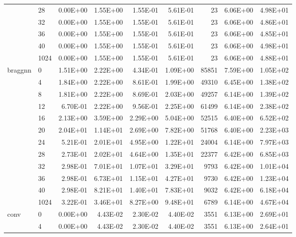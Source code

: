 \begin{longtable}{llrrrrrrr}
         & 28   &   0.00E+00 & 1.55E+00 & 1.55E-01 & 5.61E-01 &      23 &     6.06E+00 & 4.98E+01 \\
         & 32   &   0.00E+00 & 1.55E+00 & 1.55E-01 & 5.61E-01 &      23 &     6.06E+00 & 4.86E+01 \\
         & 36   &   0.00E+00 & 1.55E+00 & 1.55E-01 & 5.61E-01 &      23 &     6.06E+00 & 4.85E+01 \\
         & 40   &   0.00E+00 & 1.55E+00 & 1.55E-01 & 5.61E-01 &      23 &     6.06E+00 & 4.98E+01 \\
         & 1024 &   0.00E+00 & 1.55E+00 & 1.55E-01 & 5.61E-01 &      23 &     6.06E+00 & 4.88E+01 \\
braggnn & 0    &   1.51E+00 & 2.22E+00 & 4.34E-01 & 1.09E+00 &   85851 &     7.59E+00 & 1.05E+02 \\
         & 4    &   1.84E+00 & 2.22E+00 & 8.61E-01 & 1.99E+00 &   49310 &     6.45E+00 & 1.38E+02 \\
         & 8    &   1.81E+00 & 2.22E+00 & 8.69E-01 & 2.03E+00 &   49257 &     6.14E+00 & 1.39E+02 \\
         & 12   &   6.70E-01 & 2.22E+00 & 9.56E-01 & 2.25E+00 &   61499 &     6.14E+00 & 2.38E+02 \\
         & 16   &   2.13E+00 & 3.59E+00 & 2.29E+00 & 5.04E+00 &   52515 &     6.40E+00 & 6.52E+02 \\
         & 20   &   2.04E+01 & 1.14E+01 & 2.69E+00 & 7.82E+00 &   51768 &     6.40E+00 & 2.23E+03 \\
         & 24   &   5.21E-01 & 2.01E+01 & 4.95E+00 & 1.22E+01 &   24004 &     6.14E+00 & 7.97E+03 \\
         & 28   &   2.73E-01 & 2.02E+01 & 4.64E+00 & 1.35E+01 &   22377 &     6.42E+00 & 6.85E+03 \\
         & 32   &   2.98E-01 & 7.01E+01 & 1.07E+01 & 3.29E+01 &    9793 &     6.42E+00 & 1.01E+04 \\
         & 36   &   2.98E-01 & 6.73E+01 & 1.15E+01 & 4.27E+01 &    9730 &     6.42E+00 & 1.23E+04 \\
         & 40   &   2.98E-01 & 8.21E+01 & 1.40E+01 & 7.83E+01 &    9032 &     6.42E+00 & 6.18E+04 \\
         & 1024 &   3.22E-01 & 3.46E+01 & 8.27E+00 & 9.48E+01 &    6789 &     6.14E+00 & 4.67E+04 \\
conv & 0    &   0.00E+00 & 4.43E-02 & 2.30E-02 & 4.40E-02 &    3551 &     6.13E+00 & 2.69E+01 \\
         & 4    &   0.00E+00 & 4.43E-02 & 2.30E-02 & 4.40E-02 &    3551 &     6.13E+00 & 2.64E+01 \\

\end{longtable}
